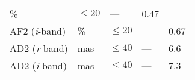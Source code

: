 \begin{longtable}[]{@{}lllll@{}}
\begin{minipage}[t]{0.08\columnwidth}
\%\strut
\end{minipage} & \begin{minipage}[t]{0.20\columnwidth}\raggedright\strut
\(\leq 20\)\strut
\end{minipage} & \begin{minipage}[t]{0.22\columnwidth}\raggedright\strut
---\strut
\end{minipage} & \begin{minipage}[t]{0.17\columnwidth}\raggedright\strut
0.47\strut
\end{minipage}\tabularnewline
\begin{minipage}[t]{0.19\columnwidth}\raggedright\strut
AF2 (\emph{i}-band)\strut
\end{minipage} & \begin{minipage}[t]{0.08\columnwidth}\raggedright\strut
\%\strut
\end{minipage} & \begin{minipage}[t]{0.20\columnwidth}\raggedright\strut
\(\leq 20\)\strut
\end{minipage} & \begin{minipage}[t]{0.22\columnwidth}\raggedright\strut
---\strut
\end{minipage} & \begin{minipage}[t]{0.17\columnwidth}\raggedright\strut
0.67\strut
\end{minipage}\tabularnewline
\begin{minipage}[t]{0.19\columnwidth}\raggedright\strut
AD2 (\emph{r}-band)\strut
\end{minipage} & \begin{minipage}[t]{0.08\columnwidth}\raggedright\strut
mas\strut
\end{minipage} & \begin{minipage}[t]{0.20\columnwidth}\raggedright\strut
\(\leq 40\)\strut
\end{minipage} & \begin{minipage}[t]{0.22\columnwidth}\raggedright\strut
---\strut
\end{minipage} & \begin{minipage}[t]{0.17\columnwidth}\raggedright\strut
6.6\strut
\end{minipage}\tabularnewline
\begin{minipage}[t]{0.19\columnwidth}\raggedright\strut
AD2 (\emph{i}-band)\strut
\end{minipage} & \begin{minipage}[t]{0.08\columnwidth}\raggedright\strut
mas\strut
\end{minipage} & \begin{minipage}[t]{0.20\columnwidth}\raggedright\strut
\(\leq 40\)\strut
\end{minipage} & \begin{minipage}[t]{0.22\columnwidth}\raggedright\strut
---\strut
\end{minipage} & \begin{minipage}[t]{0.17\columnwidth}\raggedright\strut
7.3\strut
\end{minipage}\tabularnewline
\bottomrule
\end{longtable}

